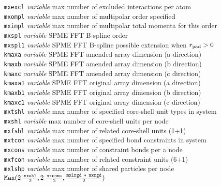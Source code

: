 \begin{tabbing}
\> {\tt mxexcl}      \> {\em variable}       \> max number of excluded interactions per atom \\
\> {\tt mxompl}      \> {\em variable}       \> max number of multipolar order specified \\
\> {\tt mximpl}      \> {\em variable}       \> max number of multipolar total momenta for this order \\
\> {\tt mxspl}       \> {\em variable}       \> SPME FFT B-spline order \\
\> {\tt mxspl1}      \> {\em variable}       \> SPME FFT B-spline possible extension when $r_{\rm pad}>0$ \\
\> {\tt kmaxa}       \> {\em variable}       \> SPME FFT amended array dimension (a direction) \\
\> {\tt kmaxb}       \> {\em variable}       \> SPME FFT amended array dimension (b direction) \\
\> {\tt kmaxc}       \> {\em variable}       \> SPME FFT amended array dimension (c direction) \\
\> {\tt kmaxa1}      \> {\em variable}       \> SPME FFT original array dimension (a direction) \\
\> {\tt kmaxb1}      \> {\em variable}       \> SPME FFT original array dimension (b direction) \\
\> {\tt kmaxc1}      \> {\em variable}       \> SPME FFT original array dimension (c direction) \\
\> {\tt mxtshl}      \> {\em variable}       \> max number of specified core-shell unit types in system \\
\> {\tt mxshl}       \> {\em variable}       \> max number of core-shell units per node \\
\> {\tt mxfshl}      \> {\em variable}       \> max number of related core-shell units (1+1) \\
\> {\tt mxtcon}      \> {\em variable}       \> max number of specified bond constraints in system \\
\> {\tt mxcons}      \> {\em variable}       \> max number of constraint bonds per a node \\
\> {\tt mxfcon}      \> {\em variable}       \> max number of related constraint units (6+1) \\
\> {\tt mxlshp}      \> {\em variable}       \> max number of shared particles per node \\
\>                   \>                      \> ${\tt Max} (2~\frac{\tt mxshl}{2},2~\frac{\tt mxcons}{2},\frac{{\tt mxlrgd}~*~{\tt mxrgd}}{2})$ \\

\end{tabbing}
